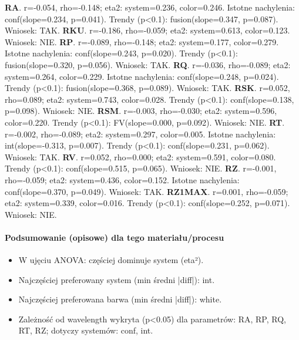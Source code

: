 \documentclass[
  10pt,
]{article}
\begin{document}
\textbf{RA}. r=-0.054, rho=-0.148; eta2: system=0.236, color=0.246.
Istotne nachylenia: conf(slope=0.234, p=0.041). Trendy (p\textless0.1):
fusion(slope=0.347, p=0.087). Wniosek: TAK. \textbf{RKU}. r=-0.186,
rho=-0.059; eta2: system=0.613, color=0.123. Wniosek: NIE. \textbf{RP}.
r=-0.089, rho=-0.148; eta2: system=0.177, color=0.279. Istotne
nachylenia: conf(slope=0.243, p=0.020). Trendy (p\textless0.1):
fusion(slope=0.320, p=0.056). Wniosek: TAK. \textbf{RQ}. r=-0.036,
rho=-0.089; eta2: system=0.264, color=0.229. Istotne nachylenia:
conf(slope=0.248, p=0.024). Trendy (p\textless0.1): fusion(slope=0.368,
p=0.089). Wniosek: TAK. \textbf{RSK}. r=0.052, rho=0.089; eta2:
system=0.743, color=0.028. Trendy (p\textless0.1): conf(slope=0.138,
p=0.098). Wniosek: NIE. \textbf{RSM}. r=-0.003, rho=-0.030; eta2:
system=0.596, color=0.220. Trendy (p\textless0.1): FV(slope=0.000,
p=0.092). Wniosek: NIE. \textbf{RT}. r=-0.002, rho=-0.089; eta2:
system=0.297, color=0.005. Istotne nachylenia: int(slope=-0.313,
p=0.007). Trendy (p\textless0.1): conf(slope=0.231, p=0.062). Wniosek:
TAK. \textbf{RV}. r=0.052, rho=0.000; eta2: system=0.591, color=0.080.
Trendy (p\textless0.1): conf(slope=0.515, p=0.065). Wniosek: NIE.
\textbf{RZ}. r=-0.001, rho=-0.059; eta2: system=0.436, color=0.152.
Istotne nachylenia: conf(slope=0.370, p=0.049). Wniosek: TAK.
\textbf{RZ1MAX}. r=0.001, rho=-0.059; eta2: system=0.339, color=0.016.
Trendy (p\textless0.1): conf(slope=0.252, p=0.071). Wniosek: NIE.

\paragraph{Podsumowanie (opisowe) dla tego materiału/procesu}
\begin{itemize}
\item W ujęciu ANOVA: częściej dominuje system (eta²).
\item Najczęściej preferowany system (min średni |diff|): int.
\item Najczęściej preferowana barwa (min średni |diff|): white.
\item Zależność od wavelength wykryta (p<0.05) dla parametrów: RA, RP, RQ, RT, RZ; dotyczy systemów: conf, int.
\end{itemize}
\end{document}
